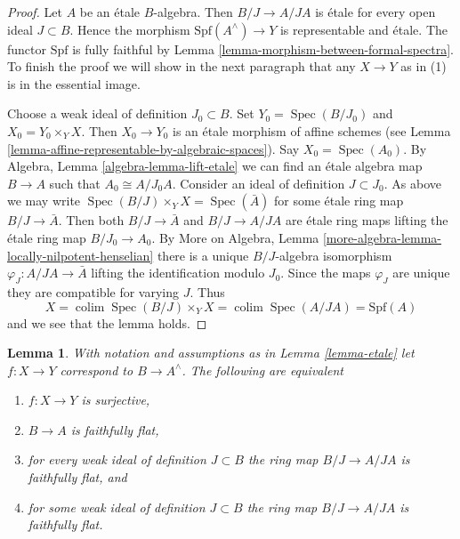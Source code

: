 \documentclass{stacks-project}
\theoremstyle{plain}
\newtheorem{lemma}[subsection]{Lemma}
\theoremstyle{definition}
\theoremstyle{remark}
\numberwithin{equation}{subsection}
\def\colim{\mathop{\mathrm{colim}}\nolimits}
\def\Spec{\mathop{\mathrm{Spec}}}
\begin{document}
\begin{proof}
Let $A$ be an \'etale $B$-algebra. Then $B/J \to A/JA$ is
\'etale for every open ideal $J \subset B$. Hence
the morphism $\text{Spf}(A^\wedge) \to Y$ is representable and \'etale.
The functor $\text{Spf}$ is fully faithful by
Lemma \ref{lemma-morphism-between-formal-spectra}.
To finish the proof we will show in the next paragraph
that any $X \to Y$ as in (1) is in the essential image.

\medskip\noindent
Choose a weak ideal of definition $J_0 \subset B$. Set
$Y_0 = \Spec(B/J_0)$ and $X_0 = Y_0 \times_Y X$. Then $X_0 \to Y_0$
is an \'etale morphism of affine schemes (see
Lemma \ref{lemma-affine-representable-by-algebraic-spaces}).
Say $X_0 = \Spec(A_0)$. By Algebra, Lemma \ref{algebra-lemma-lift-etale}
we can find an \'etale algebra map $B \to A$ such that
$A_0 \cong A/J_0A$. Consider an ideal of definition $J \subset J_0$.
As above we may write $\Spec(B/J) \times_Y X = \Spec(\bar A)$
for some \'etale ring map $B/J \to \bar A$. Then both
$B/J \to \bar A$ and $B/J \to A/JA$ are \'etale ring maps
lifting the \'etale ring map $B/J_0 \to A_0$. By
More on Algebra, Lemma \ref{more-algebra-lemma-locally-nilpotent-henselian}
there is a unique $B/J$-algebra isomorphism
$\varphi_J : A/JA \to \bar A$ lifting the identification modulo $J_0$.
Since the maps $\varphi_J$ are unique they are compatible for varying $J$.
Thus
$$
X = \colim \Spec(B/J) \times_Y X = \colim \Spec(A/JA) = \text{Spf}(A)
$$
and we see that the lemma holds.
\end{proof}

\begin{lemma}
\label{lemma-etale-surjective}
With notation and assumptions as in Lemma \ref{lemma-etale} let
$f : X \to Y$ correspond to $B \to A^\wedge$. The following are equivalent
\begin{enumerate}
\item $f : X \to Y$ is surjective,
\item $B \to A$ is faithfully flat,
\item for every weak ideal of definition $J \subset B$
the ring map $B/J \to A/JA$ is faithfully flat, and
\item for some weak ideal of definition $J \subset B$
the ring map $B/J \to A/JA$ is faithfully flat.
\end{enumerate}
\end{lemma}
\end{document}
